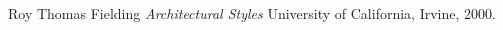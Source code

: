 \begin{thebibliography}{9}

Roy Thomas Fielding
\textit{Architectural Styles}
University of California, Irvine, 2000.

\end{thebibliography}
